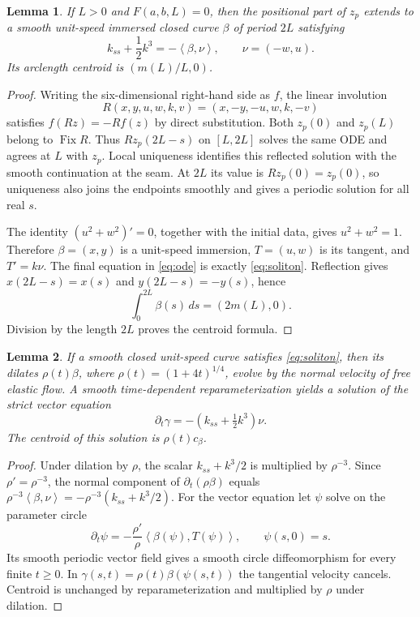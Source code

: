 \documentclass[11pt]{article}
\newtheorem{lemma}{Lemma}
\newcommand{\ip}[2]{\left\langle#1,#2\right\rangle}
\begin{document}
\begin{lemma}\label{lem:reflection}
If $L>0$ and $F(a,b,L)=0$, then the positional part of $z_p$ extends to a
smooth unit-speed immersed closed curve $\beta$ of period $2L$ satisfying
\begin{equation}\label{eq:soliton}
 k_{ss}+\frac12 k^3=-\ip{\beta}{\nu},\qquad
 \nu=(-w,u).
\end{equation}
Its arclength centroid is $(m(L)/L,0)$.
\end{lemma}
\begin{proof}
Writing the six-dimensional right-hand side as $f$, the linear involution
\[
 R(x,y,u,w,k,v)=(x,-y,-u,w,k,-v)
\]
satisfies $f(Rz)=-Rf(z)$ by direct substitution. Both $z_p(0)$ and
$z_p(L)$ belong to $\operatorname{Fix}R$. Thus
$Rz_p(2L-s)$ on $[L,2L]$ solves the same ODE and agrees at $L$ with
$z_p$. Local uniqueness identifies this reflected solution with the
smooth continuation at the seam. At $2L$ its value is
$Rz_p(0)=z_p(0)$, so uniqueness also joins the endpoints smoothly and
gives a periodic solution for all real $s$.

The identity $(u^2+w^2)'=0$, together with the initial data, gives
$u^2+w^2=1$. Therefore $\beta=(x,y)$ is a unit-speed immersion,
$T=(u,w)$ is its tangent, and $T'=k\nu$. The final equation in
\eqref{eq:ode} is exactly \eqref{eq:soliton}. Reflection gives
$x(2L-s)=x(s)$ and $y(2L-s)=-y(s)$, hence
\[
 \int_0^{2L}\beta(s)\,ds=(2m(L),0).
\]
Division by the length $2L$ proves the centroid formula.
\end{proof}

\begin{lemma}\label{lem:flow}
If a smooth closed unit-speed curve satisfies \eqref{eq:soliton}, then its
dilates $\rho(t)\beta$, where $\rho(t)=(1+4t)^{1/4}$, evolve by the
normal velocity of free elastic flow. A smooth time-dependent
reparameterization yields a solution of the strict vector equation
\[
 \partial_t\gamma=-\left(k_{ss}+\tfrac12k^3\right)\nu.
\]
The centroid of this solution is $\rho(t)c_\beta$.
\end{lemma}
\begin{proof}
Under dilation by $\rho$, the scalar $k_{ss}+k^3/2$ is multiplied by
$\rho^{-3}$. Since $\rho'=\rho^{-3}$, the normal component of
$\partial_t(\rho\beta)$ equals
$\rho^{-3}\ip{\beta}{\nu}=-\rho^{-3}(k_{ss}+k^3/2)$.
For the vector equation let $\psi$ solve on the parameter circle
\[
 \partial_t\psi=-\frac{\rho'}{\rho}
    \ip{\beta(\psi)}{T(\psi)},\qquad \psi(s,0)=s.
\]
Its smooth periodic vector field gives a smooth circle diffeomorphism
for every finite $t\ge0$. In $\gamma(s,t)=\rho(t)\beta(\psi(s,t))$
the tangential velocity cancels. Centroid is unchanged by
reparameterization and multiplied by $\rho$ under dilation.
\end{proof}
\end{document}
